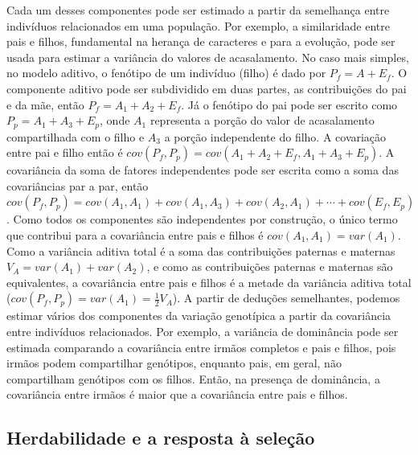 \begin{refsection}
\enlargethispage{\baselineskip} Cada um desses componentes pode ser estimado a
partir da semelhança entre indivíduos relacionados em uma população. Por
exemplo, a similaridade entre pais e filhos, fundamental na herança de
caracteres e para a evolução, pode ser usada para estimar a variância do
valores de acasalamento. No caso mais simples, no modelo aditivo, o fenótipo
de um indivíduo (filho) é dado por $P_f = A + E_f$. O componente aditivo pode
ser subdividido em duas partes, as contribuições do pai e da mãe, então $P_f =
A_1 + A_2 + E_f$. Já o fenótipo do pai pode ser escrito como $P_p = A_1 + A_3
+ E_p$, onde $A_1$ representa a porção do valor de acasalamento compartilhada
com o filho e $A_3$ a porção independente do filho. A covariação entre pai e
filho então é $cov(P_f, P_p) = cov(A_1 + A_2 + E_f, A_1 + A_3 + E_p)$. A
covariância da soma de fatores independentes pode ser escrita como a soma das
covariâncias par a par, então $cov(P_f, P_p) = cov(A_1, A_1) + cov(A_1, A_3) +
cov(A_2, A_1) + \cdots  + cov(E_f, E_p)$. Como todos os componentes são
independentes por construção, o único termo que contribui para a covariância
entre pais e filhos é $cov(A_1, A_1) = var(A_1)$. Como a variância aditiva
total é a soma das contribuições paternas e maternas $V_A = var(A_1) +
var(A_2)$, e como as contribuições paternas e maternas são equivalentes, a
covariância entre pais e filhos é a metade da variância aditiva total
($cov(P_f, P_p) = var(A_1) = \frac{1}{2}V_A$). A partir de deduções
semelhantes, podemos estimar vários dos componentes da variação genotípica a
partir da covariância entre indivíduos relacionados. Por exemplo, a variância
de dominância pode ser estimada comparando a covariância entre irmãos
completos e pais e filhos, pois irmãos podem compartilhar genótipos, enquanto
pais, em geral, não compartilham genótipos com os filhos. Então, na presença
de dominância, a covariância entre irmãos é maior que a covariância entre pais
e filhos.

\subsection{Herdabilidade e a resposta à seleção}


\end{refsection}
